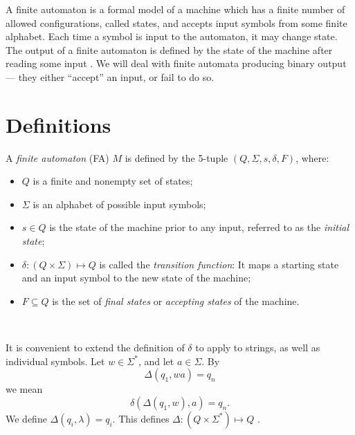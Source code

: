 \documentclass{bcthesis}
\renewcommand{\meo}[1]{}
\newcommand{\footcite}[2]{\xspace\cite[pg.~{#2}]{#1}\xspace}
\begin{document}
\label{ch:finite_automata}

	A finite automaton is a formal model of a machine which has a finite number of allowed configurations, called states, and accepts input symbols from some finite alphabet. 
	Each time a symbol is input to the automaton, it may change state. 
	The output of a finite automaton is defined by the state of the machine after reading some input \footcite{hopcroft}{13}.
	We will deal with finite automata producing binary output --- they either ``accept'' an input, or fail to do so.

	\section{Definitions} %
	\label{sec:fa_definitions}

		\begin{definition}
			A \textit{finite automaton} (FA) $M$ is defined by the 5-tuple $(Q, \Sigma, s, \delta, F)$, where:
			\begin{itemize}
				\item [] $Q$ is a finite and nonempty set of states;
				\item [] $\Sigma$ is an alphabet of possible input symbols;
				\item [] $s \in Q$ is the state of the machine prior to any input, referred to as the \textit{initial state};
				\item [] $\delta: (Q \times \Sigma) \mapsto Q$ is called the \textit{transition function}: It maps a starting state and an input symbol to the new state of the machine;
				\item [] $F \subseteq Q$ is the set of \textit{final states} or \textit{accepting states} of the machine.
			\end{itemize}
			\footcite{hopcroft}{17}~\meo{todo: something about this citation}
		\end{definition}

		\begin{remark}
			It is convenient to extend the definition of $\delta$ to apply to strings, as well as individual symbols.
			Let $w \in \Sigma^*$, and let $a \in \Sigma$.
			By 
			\[
				\Delta(q_1, wa) = q_n
			\] 
			we mean 
			\[
				\delta( \Delta(q_1, w), a) = q_n.
			\]
			We define $\Delta(q_i, \lambda) = q_i$.
			This defines $\Delta: (Q \times \Sigma^*) \mapsto Q$ \footcite{hopcroft}{17}.
		\end{remark}
\end{document}
